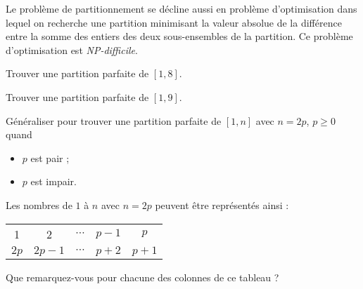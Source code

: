 \documentclass[11pt]{article}
\begin{document}
  Le problème de partitionnement se décline aussi en problème d'optimisation dans lequel on recherche une partition minimisant la valeur absolue de la différence entre la somme des entiers des deux sous-ensembles de la partition.
  Ce problème d'optimisation est \emph{NP-difficile}.

  \begin{exercice}{}
    Trouver une partition parfaite de $[1, 8]$.
  \end{exercice}


  \begin{exercice}{}
    Trouver une partition parfaite de $[1, 9]$.
  \end{exercice}


  \begin{exercice}{}
    Généraliser pour trouver une partition parfaite de $[1, n]$ avec $n=2p$, $p \geq 0$ quand 
    \begin{itemize}
      \item $p$ est pair ;
      \item $p$ est impair.
    \end{itemize}
  \end{exercice}

  \begin{indice}
    Les nombres de $1$ à $n$ avec $n = 2p$ peuvent être représentés ainsi :

    \begin{tabular}{|*{5}{c |}}
      \hline
      1 & 2 & $\cdots$ & $p-1$ & $p$\\
      $2p$ & $2p-1$ & $\cdots$ & $p+2$ & $p+1$\\\hline
    \end{tabular}

    Que remarquez-vous pour chacune des colonnes de ce tableau ?
  \end{indice}

\end{document}
